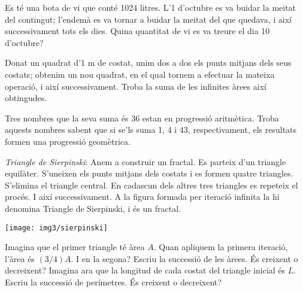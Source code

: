 \begin{activitats}
\begin{mylist}
\exer  Es té una bota de vi que conté 1024 litres. L'1 d'octubre es va buidar la meitat del contingut; l'endemà es va tornar a buidar la meitat del que quedava, i així successivament tots els dies. Quina quantitat de vi es va treure el dia 10 d'octubre? 

\exer  Donat un quadrat d'1 m de costat, unim dos a dos els punts mitjans dels seus costats; obtenim un nou quadrat, en el qual tornem a efectuar la mateixa operació, i així successivament. Troba la suma de les infinites àrees així obtingudes.

\exer  Tres nombres que la seva suma és 36 estan en progressió aritmètica. Troba aquests nombres sabent que si se'ls suma 1, 4 i 43, respectivament, els resultats formen una progressió geomètrica. 
\answers{[PG: 4; 16 i 64, PA: 3; 12 i 21]}

\exer[1] 
\textit{Triangle de Sierpinski}: Anem a construir un fractal. Es parteix d'un triangle equilàter. S'uneixen els punts mitjans dels costats i es formen quatre triangles. S'elimina el triangle central. En cadascun dels altres tres triangles es repeteix el procés. I així successivament. A la figura formada per iteració infinita la hi denomina Triangle de Sierpinski, i és un fractal.
 	\begin{center}
	\texttt{[image: img3/sierpinski]}
\end{center} 

 Imagina que el primer triangle té àrea $A$. Quan apliquem la primera iteració, l'àrea és $(3/4)A$. I en la segona? Escriu la successió de les àrees. És creixent o decreixent? Imagina ara que la longitud de cada costat del triangle inicial és $L$. Escriu la successió de perímetres. És creixent o decreixent? 
 \answers{[$A_n = A \cdot (3/4)^{n-1}$ decreixent, $P_n = 3L \cdot (3/2)^{n-1}$ creixent]}

\end{mylist}
 
\end{activitats}

